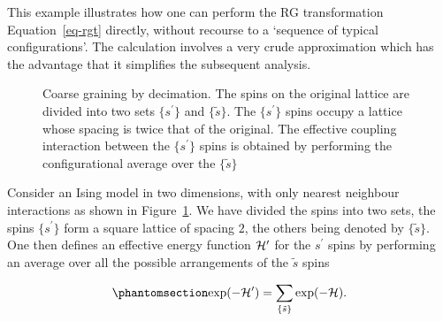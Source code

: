 \documentclass[
  letterpaper,
  enabledeprecatedfontcommands]{report}
\begin{document}
This example illustrates how one can perform the RG transformation
Equation~\ref{eq-rgt} directly, without recourse to a `sequence of
typical configurations'. The calculation involves a very crude
approximation which has the advantage that it simplifies the subsequent
analysis.

\begin{figure}


\caption{\label{fig-rglat}Coarse graining by decimation. The spins on
the original lattice are divided into two sets \(\{s^\prime\}\) and
\(\{\tilde{s}\}\). The \(\{s^\prime\}\) spins occupy a lattice whose
spacing is twice that of the original. The effective coupling
interaction between the \(\{s^\prime\}\) spins is obtained by performing
the configurational average over the \(\{\tilde{s}\}\)}

\end{figure}%

Consider an Ising model in two dimensions, with only nearest neighbour
interactions as shown in Figure~\ref{fig-rglat}. We have divided the
spins into two sets, the spins \(\{s^\prime\}\) form a square lattice of
spacing \(2\), the others being denoted by \(\{\tilde{s}\}\). One then
defines an effective energy function \({\cal H^\prime}\) for the
\(s^\prime\) spins by performing an average over all the possible
arrangements of the \(\tilde{s}\) spins

\begin{equation}\phantomsection\label{eq-decimate}{
\exp(-{\cal H}^\prime)=\sum_{\{\tilde {s}\}} \exp(-{\cal H}).
}\end{equation}
\end{document}
